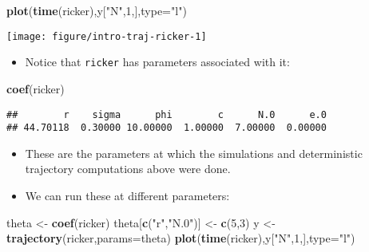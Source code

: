 \documentclass[]{article}
\newenvironment{Shaded}{\begin{snugshade}}{\end{snugshade}}
\newcommand{\KeywordTok}[1]{\textcolor[rgb]{0.13,0.29,0.53}{\textbf{#1}}}
\newcommand{\DataTypeTok}[1]{\textcolor[rgb]{0.13,0.29,0.53}{#1}}
\newcommand{\DecValTok}[1]{\textcolor[rgb]{0.00,0.00,0.81}{#1}}
\newcommand{\StringTok}[1]{\textcolor[rgb]{0.31,0.60,0.02}{#1}}
\newcommand{\NormalTok}[1]{#1}
\providecommand{\tightlist}{%
  \setlength{\itemsep}{0pt}\setlength{\parskip}{0pt}}
\begin{document}
\begin{Shaded}
\begin{Highlighting}[]
\KeywordTok{plot}\NormalTok{(}\KeywordTok{time}\NormalTok{(ricker),y[}\StringTok{"N"}\NormalTok{,}\DecValTok{1}\NormalTok{,],}\DataTypeTok{type=}\StringTok{"l"}\NormalTok{)}
\end{Highlighting}
\end{Shaded}

\begin{center}\texttt{[image: figure/intro-traj-ricker-1]} \end{center}

\begin{itemize}
\tightlist
\item
  Notice that \texttt{ricker} has parameters associated with it:
\end{itemize}

\begin{Shaded}
\begin{Highlighting}[]
\KeywordTok{coef}\NormalTok{(ricker)}
\end{Highlighting}
\end{Shaded}

\begin{verbatim}
##        r    sigma      phi        c      N.0      e.0 
## 44.70118  0.30000 10.00000  1.00000  7.00000  0.00000
\end{verbatim}

\begin{itemize}
\item
  These are the parameters at which the simulations and deterministic
  trajectory computations above were done.
\item
  We can run these at different parameters:
\end{itemize}

\begin{Shaded}
\begin{Highlighting}[]
\NormalTok{theta <-}\StringTok{ }\KeywordTok{coef}\NormalTok{(ricker)}
\NormalTok{theta[}\KeywordTok{c}\NormalTok{(}\StringTok{"r"}\NormalTok{,}\StringTok{"N.0"}\NormalTok{)] <-}\StringTok{ }\KeywordTok{c}\NormalTok{(}\DecValTok{5}\NormalTok{,}\DecValTok{3}\NormalTok{)}
\NormalTok{y <-}\StringTok{ }\KeywordTok{trajectory}\NormalTok{(ricker,}\DataTypeTok{params=}\NormalTok{theta)}
\KeywordTok{plot}\NormalTok{(}\KeywordTok{time}\NormalTok{(ricker),y[}\StringTok{"N"}\NormalTok{,}\DecValTok{1}\NormalTok{,],}\DataTypeTok{type=}\StringTok{"l"}\NormalTok{)}
\end{Highlighting}
\end{Shaded}
\end{document}
